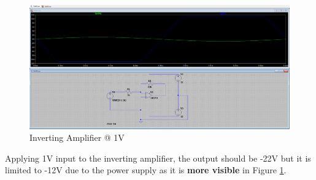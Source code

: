 \newpage
\thispagestyle{plain}

\begin{figure}[h]
    \centering
    \includegraphics[width=1\textwidth]{assets/1-inverting.png}
    \caption{Inverting Amplifier @ 1V}
    \label{fig:1-inverting}
\end{figure}

Applying 1V input to the inverting amplifier, the output should be -22V but it is limited to -12V due to the power supply as it is \textbf{more visible} in Figure \ref{fig:1-inverting}.

